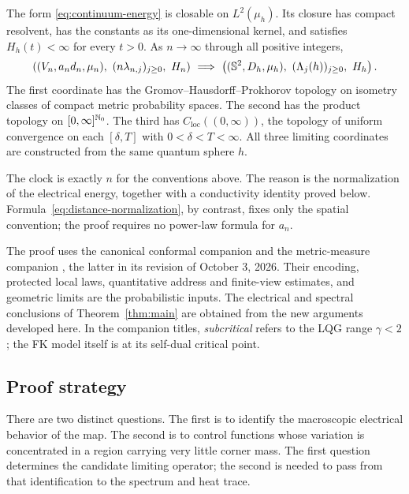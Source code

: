 \begin{theorem}\label{thm:main}
The form \eqref{eq:continuum-energy} is closable on \(L^2(\mu_h)\).
Its closure has compact resolvent, has the constants as its one-dimensional
kernel, and satisfies \(H_h(t)<\infty\) for every \(t>0\).
As \(n\to\infty\) through all positive integers,
\begin{equation}\label{eq:main-limit}
 \left(
   (V_n,a_nd_n,\mu_n),\
   (n\lambda_{n,j})_{j\ge0},\
   H_n
 \right)
 \ \Longrightarrow\
 \left(
   (\mathbb S^2,D_h,\mu_h),\
   (\Lambda_j(h))_{j\ge0},\
   H_h
 \right).
\end{equation}
The first coordinate has the Gromov--Hausdorff--Prokhorov topology on
isometry classes of compact metric probability spaces.  The second has the
product topology on \([0,\infty]^{\mathbb N_0}\).  The third has
\(C_{\mathrm{loc}}((0,\infty))\), the topology of uniform convergence on
each \([\delta,T]\) with \(0<\delta<T<\infty\).  All three limiting
coordinates are constructed from the same quantum sphere \(h\).
\end{theorem}

The clock is exactly \(n\) for the conventions above.  The reason is the
normalization of the electrical energy, together with a conductivity
identity proved below.  Formula~\eqref{eq:distance-normalization}, by
contrast, fixes only the spatial convention; the proof requires no power-law
formula for \(a_n\).

The proof uses the canonical conformal companion \cite{C} and the
metric-measure companion \cite{P}, the latter in its revision of
October 3, 2026.  Their encoding, protected local laws, quantitative address
and finite-view estimates, and geometric limits are the probabilistic inputs.
The electrical and spectral conclusions of
Theorem~\ref{thm:main} are obtained from the new arguments developed here.
In the companion titles, \emph{subcritical} refers to the LQG range
\(\gamma<2\); the FK model itself is at its self-dual critical point.

\subsection{Proof strategy}

There are two distinct questions.  The first is to identify the macroscopic
electrical behavior of the map.  The second is to control functions whose
variation is concentrated in a region carrying very little corner mass.
The first question determines the candidate limiting operator; the second
is needed to pass from that identification to the spectrum and heat trace.

